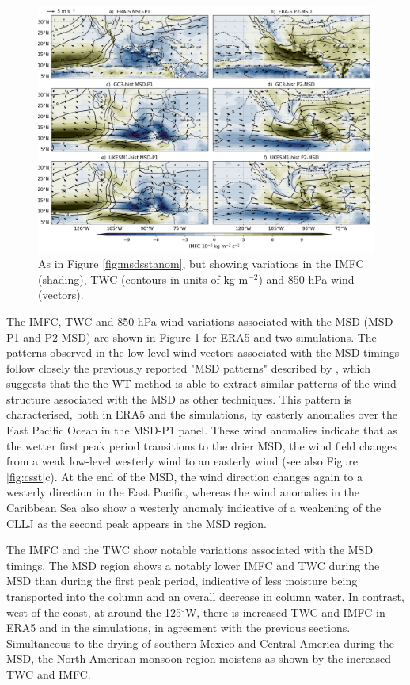 \begin{figure}[t!]
\includegraphics[width=\linewidth]{figures/imfdcomposite.png}
\caption[Composites of IMFC, TWC and CLLJ]{As in Figure \ref{fig:msdsstanom}, but showing variations in the IMFC (shading), TWC (contours in units of kg m$^{-2}$) and 850-hPa wind (vectors). }
\label{fig:msdmfcanom}
\end{figure}

The IMFC, TWC and 850-hPa wind variations associated with the MSD (MSD-P1 and P2-MSD) are shown in Figure \ref{fig:msdmfcanom} for ERA5 and two simulations. The patterns observed in the low-level wind vectors associated with the MSD timings follow closely the previously reported "MSD patterns" described by \cite{zermeno2019}, which suggests that the the WT method is able to extract similar patterns of the wind structure associated with the MSD as other techniques. 
This pattern is characterised, both  in ERA5 and the simulations, by easterly anomalies over the East Pacific Ocean in the MSD-P1 panel. These wind anomalies indicate that as the wetter first peak period transitions to the drier MSD, the wind field changes from a weak low-level westerly wind to an easterly wind (see also Figure \ref{fig:csst}c). 
At the end of the MSD, the wind direction changes again to a westerly direction in the East Pacific, whereas the wind anomalies in the Caribbean Sea also show a westerly anomaly indicative of a weakening of the CLLJ as the second peak appears in the MSD region.




The IMFC and the TWC show notable variations associated with the MSD timings. The MSD region shows a notably lower IMFC and TWC during the MSD than during the first peak period, indicative of less moisture being transported into the column and an overall decrease in column water. In contrast, west of the coast, at around the 125$^\circ$W, there is increased TWC and IMFC in ERA5 and in the simulations, in agreement with the previous sections. Simultaneous to the drying of southern Mexico and Central America during the MSD, the North American monsoon region moistens as shown by the increased TWC and IMFC. 

